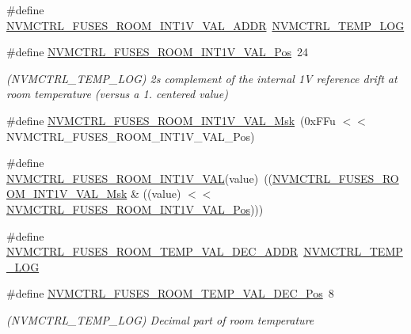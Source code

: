 \begin{DoxyCompactItemize}
\item 
\#define \mbox{\hyperlink{group__fuses__api_ga3315311ea194c341cdfffdee46859b1e}{N\+V\+M\+C\+T\+R\+L\+\_\+\+F\+U\+S\+E\+S\+\_\+\+R\+O\+O\+M\+\_\+\+I\+N\+T1\+V\+\_\+\+V\+A\+L\+\_\+\+A\+D\+DR}}~\mbox{\hyperlink{group___s_a_m_d21_j18_a__base_gae900d443ec6d7cf1c90d21b6662fa447}{N\+V\+M\+C\+T\+R\+L\+\_\+\+T\+E\+M\+P\+\_\+\+L\+OG}}
\item 
\#define \mbox{\hyperlink{group__fuses__api_ga3d18222622e6af65958612aaf3fcc326}{N\+V\+M\+C\+T\+R\+L\+\_\+\+F\+U\+S\+E\+S\+\_\+\+R\+O\+O\+M\+\_\+\+I\+N\+T1\+V\+\_\+\+V\+A\+L\+\_\+\+Pos}}~24
\begin{DoxyCompactList}\small\item\em (N\+V\+M\+C\+T\+R\+L\+\_\+\+T\+E\+M\+P\+\_\+\+L\+OG) 2\textquotesingle{}s complement of the internal 1V reference drift at room temperature (versus a 1. centered value) \end{DoxyCompactList}\item 
\#define \mbox{\hyperlink{group__fuses__api_ga3ceba0511a6acad457dce53d86b17230}{N\+V\+M\+C\+T\+R\+L\+\_\+\+F\+U\+S\+E\+S\+\_\+\+R\+O\+O\+M\+\_\+\+I\+N\+T1\+V\+\_\+\+V\+A\+L\+\_\+\+Msk}}~(0x\+F\+Fu $<$$<$ N\+V\+M\+C\+T\+R\+L\+\_\+\+F\+U\+S\+E\+S\+\_\+\+R\+O\+O\+M\+\_\+\+I\+N\+T1\+V\+\_\+\+V\+A\+L\+\_\+\+Pos)
\item 
\#define \mbox{\hyperlink{group__fuses__api_gaed5d39e28d98b1bb7a028a68e96a3ce7}{N\+V\+M\+C\+T\+R\+L\+\_\+\+F\+U\+S\+E\+S\+\_\+\+R\+O\+O\+M\+\_\+\+I\+N\+T1\+V\+\_\+\+V\+AL}}(value)~((\mbox{\hyperlink{group__fuses__api_ga3ceba0511a6acad457dce53d86b17230}{N\+V\+M\+C\+T\+R\+L\+\_\+\+F\+U\+S\+E\+S\+\_\+\+R\+O\+O\+M\+\_\+\+I\+N\+T1\+V\+\_\+\+V\+A\+L\+\_\+\+Msk}} \& ((value) $<$$<$ \mbox{\hyperlink{group__fuses__api_ga3d18222622e6af65958612aaf3fcc326}{N\+V\+M\+C\+T\+R\+L\+\_\+\+F\+U\+S\+E\+S\+\_\+\+R\+O\+O\+M\+\_\+\+I\+N\+T1\+V\+\_\+\+V\+A\+L\+\_\+\+Pos}})))
\item 
\#define \mbox{\hyperlink{group__fuses__api_ga79376d296cde495121a714c2bcb33c92}{N\+V\+M\+C\+T\+R\+L\+\_\+\+F\+U\+S\+E\+S\+\_\+\+R\+O\+O\+M\+\_\+\+T\+E\+M\+P\+\_\+\+V\+A\+L\+\_\+\+D\+E\+C\+\_\+\+A\+D\+DR}}~\mbox{\hyperlink{group___s_a_m_d21_j18_a__base_gae900d443ec6d7cf1c90d21b6662fa447}{N\+V\+M\+C\+T\+R\+L\+\_\+\+T\+E\+M\+P\+\_\+\+L\+OG}}
\item 
\#define \mbox{\hyperlink{group__fuses__api_gab9dc4439ac02a58c79db1446ec462f97}{N\+V\+M\+C\+T\+R\+L\+\_\+\+F\+U\+S\+E\+S\+\_\+\+R\+O\+O\+M\+\_\+\+T\+E\+M\+P\+\_\+\+V\+A\+L\+\_\+\+D\+E\+C\+\_\+\+Pos}}~8
\begin{DoxyCompactList}\small\item\em (N\+V\+M\+C\+T\+R\+L\+\_\+\+T\+E\+M\+P\+\_\+\+L\+OG) Decimal part of room temperature \end{DoxyCompactList}\item 

\end{DoxyCompactItemize}
